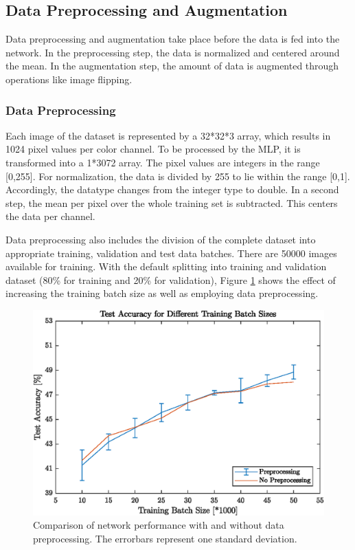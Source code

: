 \FloatBarrier
\subsection{Data Preprocessing and Augmentation}\label{subsec:preProp}

Data preprocessing and augmentation take place before the data is fed into the network. In the preprocessing step, the data is normalized and centered around the mean. In the augmentation step, the amount of data is augmented through operations like image flipping. 
 
\subsubsection{Data Preprocessing}\label{subsub:dataPreProp}

  	Each image of the dataset is represented by a 32*32*3 array, which results in 1024 pixel values per color channel. To be processed by the MLP, it is transformed into a 1*3072 array. The pixel values are integers in the range [0,255]. For normalization, the data is divided by 255 to lie within the range [0,1]. Accordingly, the datatype changes from the integer type to double. In a second step, the mean per pixel over the whole training set is subtracted. This centers the data per channel.
  	
  	Data preprocessing also includes the division of the complete dataset into appropriate training, validation and test data batches. There are 50000 images available for training. With the default splitting into training and validation dataset (80\% for training and 20\% for validation), Figure \ref{fig:dataPreprocessing} shows the effect of increasing the training batch size as well as employing data preprocessing.
  	
  	\begin{figure}[h!]
  		\centering
   		\includegraphics{images/dataPreprocessing}
   		\caption{Comparison of network performance with and without data preprocessing. The errorbars represent one standard deviation.}
   		\label{fig:dataPreprocessing}
   	\end{figure}
   	
